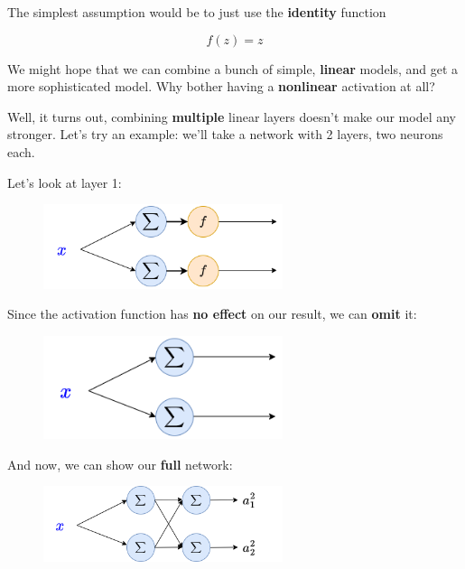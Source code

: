         The simplest assumption would be to just use the \textbf{identity} function 
        
        \begin{equation}
            f(z) = z
        \end{equation}
        
        We might hope that we can combine a bunch of simple, \textbf{linear} models, and get a more sophisticated model. Why bother having a \textbf{nonlinear} activation at all?
        
        Well, it turns out, combining \textbf{multiple} linear layers doesn't make our model any stronger. Let's try an example: we'll take a network with 2 layers, two neurons each.
        
        Let's look at layer 1: 
        
        \begin{figure}[H]
            \centering
            \includegraphics[width=70mm,scale=0.4]{images/nn_images/layer_one_linear.png}
        \end{figure}
        
        Since the activation function has \textbf{no effect} on our result, we can \textbf{omit} it:
        
        \begin{figure}[H]
            \centering
            \includegraphics[width=70mm,scale=0.4]{images/nn_images/linear_layer_omitted.png}
        \end{figure}
        
        And now, we can show our \textbf{full} network:
        
        \begin{figure}[H]
            \centering
            \includegraphics[width=70mm,scale=0.4]{images/nn_images/two_layers_linear.png}
        \end{figure}
        
